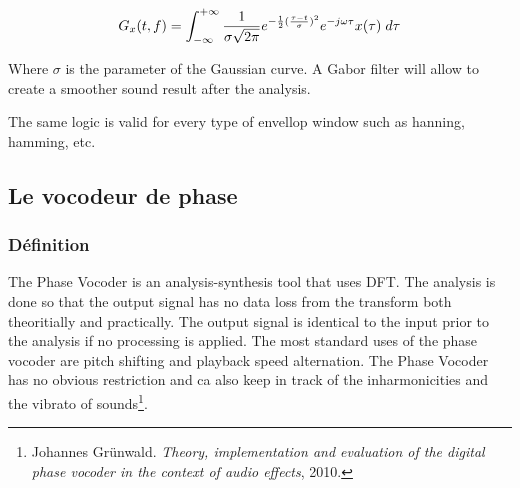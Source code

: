 
\begin{equation}
    G_x(t,f) = \int_{-\infty}^{+\infty} \frac{1}{\sigma \sqrt{2 \pi}} e ^ {-\frac{1}{2}(\frac{\tau-t}{\sigma})^2} e ^ {-j\omega \tau} x(\tau)\hspace{1mm} d\tau  
\end{equation}

Where $\sigma$ is the parameter of the Gaussian curve. A Gabor filter will allow to create a smoother sound result after the analysis.


The same logic is valid for every type of envellop window such as hanning, hamming, etc.







    \subsection{Le vocodeur de phase}
    
    
        \subsubsection{Définition}   

The Phase Vocoder is an analysis-synthesis tool that uses DFT. The analysis is done so that the output signal has no data loss from the transform both theoritially and practically. The output signal is identical to the input prior to the analysis if no processing is applied. The most standard uses of the phase vocoder are pitch shifting and playback speed alternation. The Phase Vocoder has no obvious restriction and ca also keep in track of the inharmonicities and the vibrato of sounds\footnote{Johannes Grünwald. \textit{Theory, implementation and evaluation of the digital phase vocoder in the context of audio effects}, 2010.}.

